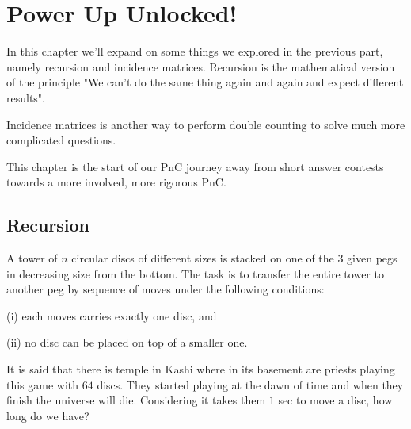 \chapter{Power Up Unlocked!}
\label{ch: powerup}

In this chapter we'll expand on some things we explored in the previous part, namely recursion and incidence 
matrices. Recursion is the mathematical version of the principle "We can't do the same thing again and 
again and expect different results". \par
Incidence matrices is another way to perform double counting to solve much more complicated questions.\par
This chapter is the start of our PnC journey away from short answer contests towards a more involved, 
more rigorous PnC.
\section{Recursion}
\begin{example}
A tower of $n$ circular discs of different sizes is stacked on one of the 3 given pegs in 
decreasing size from the bottom. The task is to transfer the entire tower to another peg by 
sequence of moves under the
following conditions:\par 
(i) each moves carries exactly one disc, and\par 
(ii) no disc can be placed on top of a smaller one.\par
It is said that there is temple in Kashi where in its basement are priests playing this game 
with $64$ discs. They started playing at the dawn of time and when they finish the universe will 
die. Considering it takes them $1$ sec to move a disc, how long do we have?
\end{example}
